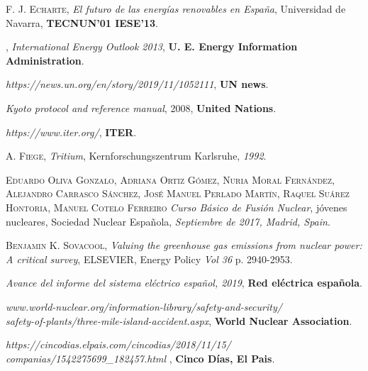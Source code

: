 \begin{thebibliography}{100}
 \textsc{F. J. Echarte},
\textit{El futuro de las energías renovables en España}, Universidad de Navarra, \textbf{TECNUN'01 IESE'13}.

,
\textit{International Energy Outlook 2013},  \textbf{U. E. Energy Information Administration}.

\textit{https://news.un.org/en/story/2019/11/1052111}, \textbf{UN news}.

\textit{Kyoto protocol and reference manual}, 2008, \textbf{United Nations}.

\textit{https://www.iter.org/}, \textbf{ITER}.

 \textsc{A. Fiege}, 
\textit{Tritium}, Kernforschungszentrum Karlsruhe, \textit{1992}.

 \textsc{Eduardo Oliva Gonzalo}, \textsc{Adriana Ortiz Gómez}, \textsc{Nuria Moral Fernández}, \textsc{Alejandro Carrasco Sánchez}, \textsc{José Manuel Perlado Martín}, \textsc{Raquel Suárez Hontoria}, \textsc{Manuel Cotelo Ferreiro} 
\textit{Curso Básico de Fusión Nuclear}, jóvenes nucleares, Sociedad Nuclear Española, \textit{Septiembre de 2017, Madrid, Spain}.

 \textsc{Benjamin K. Sovacool}, 
\textit{Valuing the greenhouse gas emissions from nuclear power: A critical survey}, 
ELSEVIER, Energy Policy  \textit{Vol 36} p. 2940-2953.

\textit{Avance del informe del sistema eléctrico español, 2019}, 
\textbf{Red eléctrica española}.

\textit{www.world-nuclear.org/information-library/safety-and-security/\\
safety-of-plants/three-mile-island-accident.aspx}, \textbf{World Nuclear Association}.

\textit{https://cincodias.elpais.com/cincodias/2018/11/15/\\
companias/1542275699\_182457.html
}, \textbf{Cinco Días, El Pais}.


\end{thebibliography}
